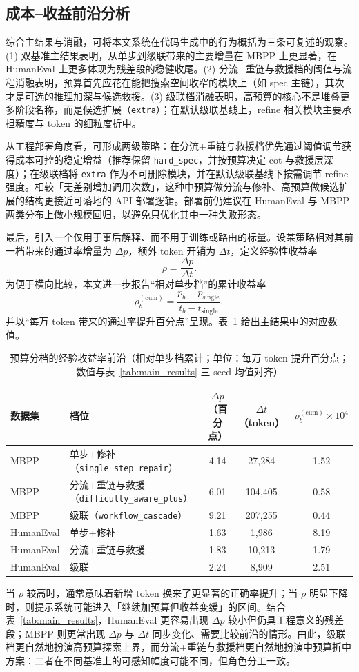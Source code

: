\subsection{成本--收益前沿分析}
\label{sec:cost_rho}

综合主结果与消融，可将本文系统在代码生成中的行为概括为三条可复述的观察。(1) 双基准主结果表明，从单步到级联带来的主要增量在 MBPP 上更显著，在 HumanEval 上更多体现为残差段的稳健收尾。(2) 分流+重链与救援档的阈值与流程消融表明，预算首先应花在能把搜索空间收窄的模块上（如 spec 主链），其次才是可选的推理加深与候选救援。(3) 级联档消融表明，高预算的核心不是堆叠更多阶段名称，而是候选扩展（\texttt{extra}）；在默认级联基线上，refine 相关模块主要承担精度与 token 的细粒度折中。

从工程部署角度看，可形成两级策略：在分流+重链与救援档优先通过阈值调节获得成本可控的稳定增益（推荐保留 \texttt{hard\_spec}，并按预算决定 cot 与救援层深度）；在级联档将 \texttt{extra} 作为不可删除模块，并在默认级联基线下按需调节 refine 强度。相较「无差别增加调用次数」，这种中预算做分流与修补、高预算做候选扩展的结构更接近可落地的 API 部署逻辑。部署前仍建议在 HumanEval 与 MBPP 两类分布上做小规模回归，以避免只优化其中一种失败形态。

最后，引入一个仅用于事后解释、而不用于训练或路由的标量。设某策略相对其前一档带来的通过率增量为 $\Delta p$，额外 token 开销为 $\Delta t$，定义经验性收益率
\begin{equation}
\rho=\frac{\Delta p}{\Delta t}.
\end{equation}
为便于横向比较，本文进一步报告“相对单步档”的累计收益率
\begin{equation}
\rho_b^{(\mathrm{cum})}=\frac{p_b-p_{\mathrm{single}}}{t_b-t_{\mathrm{single}}},
\end{equation}
并以“每万 token 带来的通过率提升百分点”呈现。表~\ref{tab:rho_frontier} 给出主结果中的对应数值。

\begin{table}[htbp]
\centering
\small
\caption{预算分档的经验收益率前沿（相对单步档累计；单位：每万 token 提升百分点；数值与表~\ref{tab:main_results} 三 seed 均值对齐）}
\label{tab:rho_frontier}
\begin{tabularx}{\textwidth}{p{1.9cm} p{3.0cm} c c c}
\toprule
数据集 & 档位 & $\Delta p$（百分点） & $\Delta t$（token） & $\rho_b^{(\mathrm{cum})}\times 10^4$ \\
\midrule
MBPP & 单步+修补（\texttt{single\_step\_repair}） & 4.14 & 27,284 & 1.52 \\
MBPP & 分流+重链与救援（\texttt{difficulty\_aware\_plus}） & 6.01 & 104,405 & 0.58 \\
MBPP & 级联（\texttt{workflow\_cascade}） & 9.21 & 207,255 & 0.44 \\
\midrule
HumanEval & 单步+修补 & 1.63 & 1,986 & 8.19 \\
HumanEval & 分流+重链与救援 & 1.83 & 10,213 & 1.79 \\
HumanEval & 级联 & 2.24 & 8,909 & 2.51 \\
\bottomrule
\end{tabularx}
\end{table}

当 $\rho$ 较高时，通常意味着新增 token 换来了更显著的正确率提升；当 $\rho$ 明显下降时，则提示系统可能进入「继续加预算但收益变缓」的区间。结合表~\ref{tab:main_results}，HumanEval 更容易出现 $\Delta p$ 较小但仍具工程意义的残差段；MBPP 则更常出现 $\Delta p$ 与 $\Delta t$ 同步变化、需要比较前沿的情形。由此，级联档更自然地扮演高预算探索上界，而分流+重链与救援档更自然地扮演中预算折中方案：二者在不同基准上的可感知幅度可能不同，但角色分工一致。